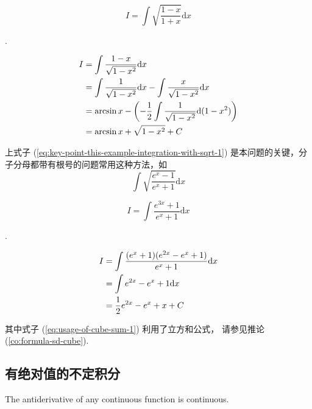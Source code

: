 \begin{example}
    \[
        I = \int \sqrt{\frac{1-x}{1+x}} \mathrm dx
    \]
    
    \cite[page 129, question 11]{yc}.

    \begin{align}
        I &= \int \frac{1-x}{\sqrt{1-x^2}} \mathrm dx \label{eq:key-point-this-example-integration-with-sqrt-1} \\
          &= \int \frac{1}{\sqrt{1 - x^2}} \mathrm dx - \int \frac{x}{\sqrt{1 - x^2}} \mathrm dx \notag \\
          &= \arcsin x - \left(-\frac{1}{2} \int \frac{1}{\sqrt{1-x^2}} \mathrm d(1-x^2)\right) \notag \\ 
          &= \arcsin x + \sqrt{1 - x^2} + C \notag
    \end{align}

    上式子 (\ref{eq:key-point-this-example-integration-with-sqrt-1}) 
    是本问题的关键，分子分母都带有根号的问题常用这种方法，如
    \[
        \int \sqrt{\dfrac{e^x - 1}{e^x + 1}} \mathrm dx
    \]
\end{example}

\begin{example}
    \[
        I = \int \dfrac{e^{3x} + 1}{e^x + 1} \mathrm dx
    \]

    \cite[page 130, question 21]{yc}.

    \begin{align}
        I &= \int \dfrac{(e^x + 1)(e^{2x} - e^x + 1)}{e^x + 1} \mathrm dx \label{eq:usage-of-cube-sum-1}\\
          &= \int e^{2x} - e^x + 1 \mathrm dx \notag \\
          &= \frac{1}{2} e^{2x} - e^x + x+ C \notag
    \end{align}

    其中式子 (\ref{eq:usage-of-cube-sum-1}) 利用了立方和公式，
    请参见推论 (\ref{co:formula-sd-cube}).
\end{example}

\subsection{有绝对值的不定积分}

\begin{theorem}
    \label{thm:i-dont-know-how-to-name-this-theorem-2}
    The antiderivative of any continuous function is continuous.
\end{theorem}

